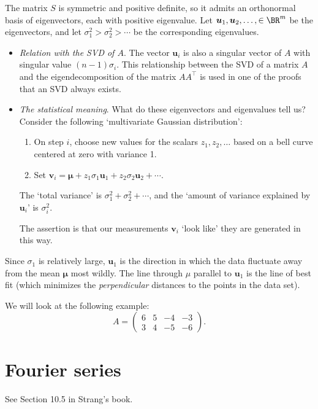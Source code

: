 \documentclass[10pt]{amsart}
\theoremstyle{mythm}
\theoremstyle{definition}
\theoremstyle{myrmk}
\begin{document}
	The matrix $S$ is symmetric and positive definite, so it admits an orthonormal basis of eigenvectors, each with positive eigenvalue. Let $\bm{u}_1, \bm{u}_2, \ldots, \in \BR^m$ be the eigenvectors, and let $\sigma_1^2 > \sigma_2^2 > \cdots$ be the corresponding eigenvalues. 
	\begin{itemize}
		\item \emph{Relation with the SVD of $A$}. The vector $\bm{u}_i$ is also a singular vector of $A$ with singular value $(n-1)\sigma_i$. This relationship between the SVD of a matrix $A$ and the eigendecomposition of the matrix $AA^\top$ is used in one of the proofs that an SVD always exists. 
		\item \emph{The statistical meaning}. What do these eigenvectors and eigenvalues tell us? Consider the following `multivariate Gaussian distribution': 
		\begin{enumerate}
			\item On step $i$, choose new values for the scalars $z_1, z_2, \ldots$ based on a bell curve centered at zero with variance 1. 
			\item Set $\bm{v}_i = \bm{\mu} + z_1 \sigma_1 \bm{u}_1 + z_2 \sigma_2 \bm{u}_2 + \cdots$. 
		\end{enumerate}
		The `total variance' is $\sigma_1^2 + \sigma_2^2 + \cdots$, and the `amount of variance explained by $\bm{u}_i$' is $\sigma_i^2$. 
		
		The assertion is that our measurements $\bm{v}_i$ `look like' they are generated in this way. 
	\end{itemize}
	Since $\sigma_1$ is relatively large, $\bm{u}_1$ is the direction in which the data fluctuate away from the mean $\bm{\mu}$ most wildly. The line through $\mu$ parallel to $\bm{u}_1$ is the line of best fit (which minimizes the \emph{perpendicular} distances to the points in the data set). 
	
	We will look at the following example: 
	\[
		A = \begin{pmatrix}
		6 & 5 & -4 & -3 \\
		3 & 4 & -5 & -6
		\end{pmatrix}. 
	\]
	
	\section{Fourier series} 
	
	See Section 10.5 in Strang's book. 
	
\end{document}
